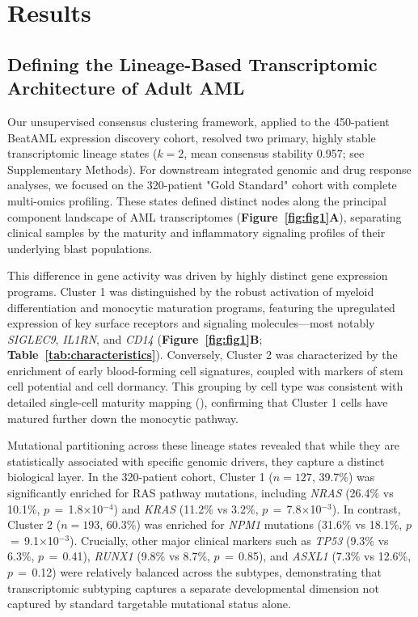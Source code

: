 \documentclass[11pt,a4paper]{article}
\newcommand{\pval}[1]{$p$\,$=$\,#1}
\begin{document}
\section{Results}

\subsection{Defining the Lineage-Based Transcriptomic Architecture of Adult AML}

Our unsupervised consensus clustering framework, applied to the 450-patient BeatAML expression discovery cohort, resolved two primary, highly stable transcriptomic lineage states ($k=2$, mean consensus stability 0.957; see Supplementary Methods). For downstream integrated genomic and drug response analyses, we focused on the 320-patient "Gold Standard" cohort with complete multi-omics profiling. These states defined distinct nodes along the principal component landscape of AML transcriptomes (\textbf{Figure~\ref{fig:fig1}A}), separating clinical samples by the maturity and inflammatory signaling profiles of their underlying blast populations.

This difference in gene activity was driven by highly distinct gene expression programs. Cluster 1 was distinguished by the robust activation of myeloid differentiation and monocytic maturation programs, featuring the upregulated expression of key surface receptors and signaling molecules—most notably \textit{SIGLEC9}, \textit{IL1RN}, and \textit{CD14} (\textbf{Figure~\ref{fig:fig1}B}; \textbf{Table~\ref{tab:characteristics}}). Conversely, Cluster 2 was characterized by the enrichment of early blood-forming cell signatures, coupled with markers of stem cell potential and cell dormancy. This grouping by cell type was consistent with detailed single-cell maturity mapping (\cite{vangalen2019single}), confirming that Cluster 1 cells have matured further down the monocytic pathway.

Mutational partitioning across these lineage states revealed that while they are statistically associated with specific genomic drivers, they capture a distinct biological layer. In the 320-patient cohort, Cluster 1 ($n=127$, 39.7\%) was significantly enriched for RAS pathway mutations, including \textit{NRAS} (26.4\% vs 10.1\%, \pval{1.8$\times$10$^{-4}$}) and \textit{KRAS} (11.2\% vs 3.2\%, \pval{7.8$\times$10$^{-3}$}). In contrast, Cluster 2 ($n=193$, 60.3\%) was enriched for \textit{NPM1} mutations (31.6\% vs 18.1\%, \pval{9.1$\times$10$^{-3}$}). Crucially, other major clinical markers such as \textit{TP53} (9.3\% vs 6.3\%, \pval{0.41}), \textit{RUNX1} (9.8\% vs 8.7\%, \pval{0.85}), and \textit{ASXL1} (7.3\% vs 12.6\%, \pval{0.12}) were relatively balanced across the subtypes, demonstrating that transcriptomic subtyping captures a separate developmental dimension not captured by standard targetable mutational status alone.
\end{document}
